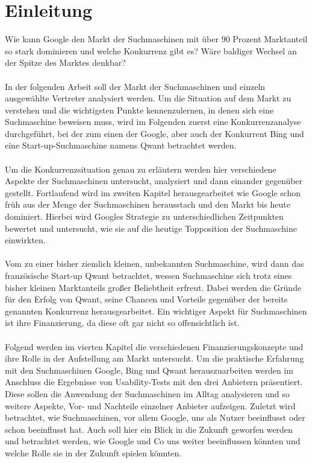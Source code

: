 \section{Einleitung}\label{sec:einleitung}
Wie kann Google den Markt der Suchmaschinen mit über 90 Prozent Marktanteil so stark dominieren und welche Konkurrenz gibt es?
Wäre baldiger Wechsel an der Spitze des Marktes denkbar?\\\\
In der folgenden Arbeit soll der Markt der Suchmaschinen und einzeln ausgewählte Vertreter analysiert werden.
Um die Situation auf dem Markt zu verstehen und die wichtigsten Punkte kennenzulernen, in denen sich eine Suchmaschine beweisen muss,
wird im Folgenden zuerst eine Konkurrenzanalyse durchgeführt, bei der zum einen der  Google,
aber auch der Konkurrent Bing und eine Start-up-Suchmaschine namens Qwant betrachtet werden.\\\\
Um die Konkurrenzsituation genau zu erläutern werden hier verschiedene Aspekte der Suchmaschinen untersucht, analysiert und dann einander gegenüber gestellt.
Fortlaufend wird im zweiten Kapitel herausgearbeitet wie Google schon früh aus der Menge der Suchmaschinen herausstach und den Markt bis heute dominiert.
Hierbei wird Googles Strategie zu unterschiedlichen Zeitpunkten bewertet und untersucht, wie sie auf die heutige Topposition der Suchmaschine einwirkten.\\\\
Vom  zu einer bisher ziemlich kleinen, unbekannten Suchmaschine,
wird dann das französische Start-up Qwant betrachtet, wessen Suchmaschine sich trotz eines bisher kleinen Marktanteils großer Beliebtheit erfreut.
Dabei werden die Gründe für den Erfolg von Qwant, seine Chancen und Vorteile gegenüber der bereits genannten Konkurrenz herausgearbeitet.
Ein wichtiger Aspekt für Suchmaschinen ist ihre Finanzierung, da diese oft gar nicht so offensichtlich ist.\\\\
Folgend werden im vierten Kapitel die verschiedenen Finanzierungskonzepte und ihre Rolle in der Aufstellung am Markt untersucht.
Um die praktische Erfahrung mit den Suchmaschinen Google, Bing und Qwant herauszuarbeiten werden im Anschluss die Ergebnisse von Usability-Tests mit den drei Anbietern präsentiert.
Diese sollen die Anwendung der Suchmaschinen im Alltag analysieren und so weitere Aspekte, Vor- und Nachteile einzelner Anbieter aufzeigen.
Zuletzt wird betrachtet, wie Suchmaschinen, vor allem Google, uns als Nutzer beeinflusst oder schon beeinflusst hat.
Auch soll hier ein Blick in die Zukunft geworfen werden und betrachtet werden, wie Google und Co uns weiter beeinflussen könnten und welche Rolle sie in der Zukunft spielen könnten.